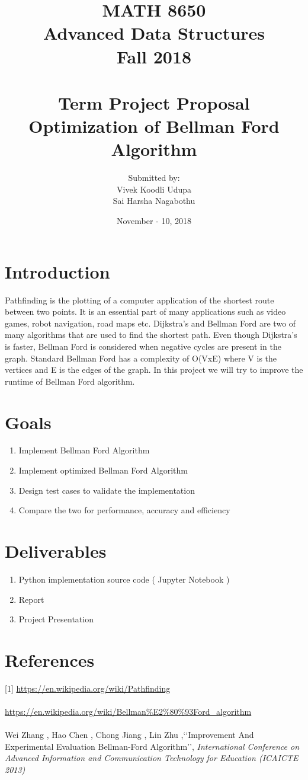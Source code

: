\documentclass[12pt]{article}
\title{MATH 8650 \\ Advanced Data Structures \\ Fall 2018\\ \quad \\
	Term Project Proposal \\ Optimization of Bellman Ford Algorithm}
\author{Submitted by: 
\\ Vivek Koodli Udupa 
\\ Sai Harsha Nagabothu}
\date{November - 10, 2018 }
\begin{document}
\begin{mdframed}
\maketitle
\end{mdframed}

\section{Introduction}
Pathfinding is the plotting of a computer application of the shortest route between two points. It is an essential part of many applications such as video games, robot navigation, road maps etc. Dijkstra's and Bellman Ford are two of many algorithms that are used to find the shortest path. Even though Dijkstra's is faster, Bellman Ford is considered when negative cycles are present in the graph.  
Standard Bellman Ford has a complexity of O(VxE) where V is the vertices and E is the edges of the graph. In this project we will try to improve the runtime of Bellman Ford algorithm.  
\section{Goals}
\begin{enumerate}
	\item Implement Bellman Ford Algorithm
	\item Implement optimized Bellman Ford Algorithm
	\item Design test cases to validate the implementation
	\item Compare the two for performance, accuracy and efficiency
\end{enumerate}

\section{Deliverables}
\begin{enumerate}
	\item Python implementation source code ( Jupyter Notebook )
	\item Report
	\item Project Presentation
\end{enumerate}

\section{References}
[1] \url{https://en.wikipedia.org/wiki/Pathfinding} \\
\\ \noindent
[2] \url{https://en.wikipedia.org/wiki/Bellman\%E2\%80\%93Ford_algorithm} \\
\\ \noindent
[3] Wei Zhang , Hao Chen , Chong Jiang , Lin Zhu ,\lq\lq{}Improvement And Experimental Evaluation Bellman-Ford Algorithm\rq\rq{}, \textit{International Conference on Advanced Information and Communication Technology for Education (ICAICTE 2013)}
\end{document}
